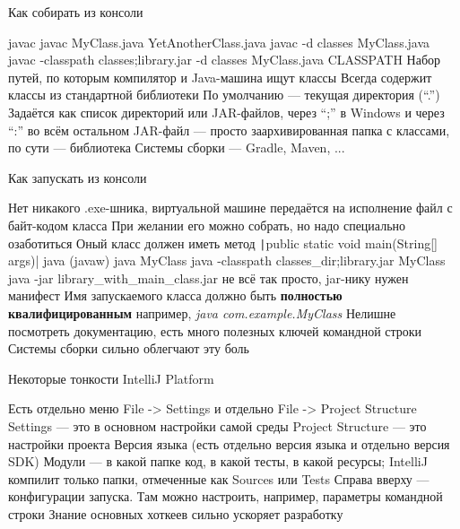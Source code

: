 \documentclass{../../slides-style}
\begin{document}
    \begin{frame}{Как собирать из консоли}
        \begin{outline}
            \1 javac
                \2 javac MyClass.java YetAnotherClass.java
                \2 javac -d classes MyClass.java
                \2 javac -classpath classes;library.jar -d classes MyClass.java
            \1 CLASSPATH
                \2 Набор путей, по которым компилятор и Java-машина ищут классы
                \2 Всегда содержит классы из стандартной библиотеки
                \2 По умолчанию --- текущая директория (``.'')
                \2 Задаётся как список директорий или JAR-файлов, через ``;'' в Windows и через ``:'' во всём остальном
                    \3 JAR-файл --- просто заархивированная папка с классами, по сути --- библиотека
            \1 Системы сборки --- Gradle, Maven, ...
        \end{outline}
    \end{frame}

    \begin{frame}{Как запускать из консоли}
        \begin{outline}
            \1 Нет никакого .exe-шника, виртуальной машине передаётся на исполнение файл с байт-кодом класса
                \2 При желании его можно собрать, но надо специально озаботиться
            \1 Оный класс должен иметь метод \texttt|public static void main(String[] args)|
            \1 java (javaw)
                \2 java MyClass
                \2 java -classpath classes\_dir;library.jar MyClass
                \2 java -jar library\_with\_main\_class.jar
                    \3 не всё так просто, jar-нику нужен манифест
                \2 Имя запускаемого класса должно быть \textbf{полностью квалифицированным}
                    \3 например, \textit{java com.example.MyClass}
                \2 Нелишне посмотреть документацию, есть много полезных ключей командной строки
            \1 Системы сборки сильно облегчают эту боль
        \end{outline}
    \end{frame}

    \begin{frame}{Некоторые тонкости IntelliJ Platform}
        \begin{outline}
            \1 Есть отдельно меню File -> Settings и отдельно File -> Project Structure
                \2 Settings --- это в основном настройки самой среды
                \2 Project Structure --- это настройки проекта
                    \3 Версия языка (есть отдельно версия языка и отдельно версия SDK)
                    \3 Модули --- в какой папке код, в какой тесты, в какой ресурсы; IntelliJ компилит только папки, отмеченные как Sources или Tests
            \1 Справа вверху --- конфигурации запуска. Там можно настроить, например, параметры командной строки
            \1 Знание основных хоткеев сильно ускоряет разработку
        \end{outline}
    \end{frame}
\end{document}
